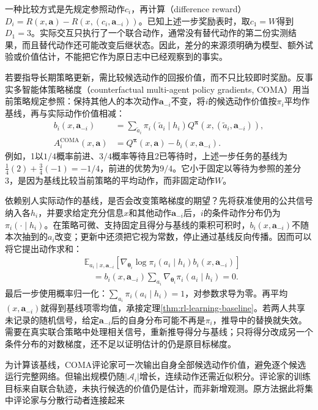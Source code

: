 一种比较方式是先规定参照动作$c_i$，再计算（difference reward）
$D_i=R(x,\bm a)-R(x,(c_i,\bm a_{-i}))$。已知上述一步奖励表时，取$c_1=W$得到$D_1=3$。实际交互只执行了一个联合动作，通常没有替代动作的第二份实测结果，而且替代动作还可能改变后继状态。因此，差分的来源须明确为模型、额外试验或价值估计，不能把它作为原日志中已经观察到的事实。

若要指导长期策略更新，需比较候选动作的回报价值，而不只比较即时奖励。反事实多智能体策略梯度（counterfactual multi-agent policy gradients, COMA）用当前策略规定参照：保持其他人的本次动作$\bm a_{-i}$不变，将$i$的候选动作价值按$\pi_i$平均作基线，再与实际动作价值相减：
\begin{align}
 b_i(x,\bm a_{-i})
 &=\sum_{\tilde a_i}\pi_i(\tilde a_i\mid h_i)
       Q^{\bm\pi}(x,(\tilde a_i,\bm a_{-i})),\\
 A_i^{\text{COMA}}(x,\bm a)
 &=Q^{\bm\pi}(x,\bm a)-b_i(x,\bm a_{-i}).
 \label{eq:rl-multi-agent-coma}
\end{align}
例如，1以$1/4$概率前进、$3/4$概率等待且2已等待时，上述一步任务的基线为
$\tfrac14(2)+\tfrac34(-1)=-1/4$，前进的优势为$9/4$。它小于固定以等待为参照的差分3，是因为基线比较当前策略的平均动作，而非固定动作$W$。

依赖别人实际动作的基线，是否会改变策略梯度的期望？先将获准使用的公共信号纳入各$h_i$，并要求给定充分信息$x$和其他动作$\bm a_{-i}$后，$i$的条件动作分布仍为$\pi_i(\cdot\mid h_i)$。在策略可微、支持固定且得分与基线的乘积可积时，$b_i(x,\bm a_{-i})$不随本次抽到的$a_i$改变；更新中还须把它视为常数，停止通过基线反向传播。因而可以将它提出动作求和：
\begin{align}
 &\mathbb E_{a_i\mid x,\bm a_{-i}}
   [\nabla_{\bm\theta_i}\log\pi_i(a_i\mid h_i)b_i(x,\bm a_{-i})]\nonumber\\
 &\quad=b_i(x,\bm a_{-i})
       \sum_{a_i}\nabla_{\bm\theta_i}\pi_i(a_i\mid h_i)=0.
 \label{eq:rl-multi-agent-baseline-zero}
\end{align}
最后一步使用概率归一化：$\sum_{a_i}\pi_i(a_i\mid h_i)=1$，对参数求导为零。再平均$(x,\bm a_{-i})$就得到基线项零均值，承接定理\ref{thm:rl-learning-baseline}。若两人共享未记录的随机信号，给定$\bm a_{-i}$后的自身分布可能不再是$\pi_i$，推导中的替换就失效。需要在真实联合策略中处理相关信号，重新推导得分与基线；只将得分改成另一个条件分布的对数梯度，还不足以证明估计的仍是原目标梯度。

为计算该基线，COMA评论家可一次输出自身全部候选动作价值，避免逐个候选运行完整网络。但输出规模仍随$|\mathcal A_i|$增长，连续动作还需近似积分。评论家的训练目标来自联合轨迹，未执行候选的价值仍是估计，而非新增观测。原方法据此将集中评论家与分散行动者连接起来

